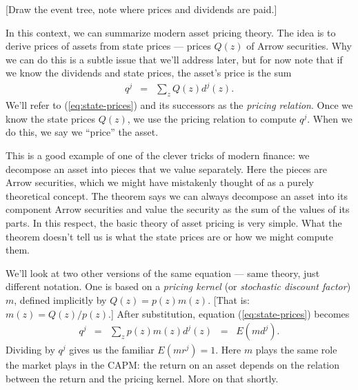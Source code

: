 \documentclass[11pt]{article}
\begin{document}
[Draw the event tree, note where prices and dividends are paid.]

In this context, we can summarize modern asset pricing theory.
The idea is to derive prices of assets from state prices
--- prices $Q(z)$ of Arrow securities.
Why we can do this is a subtle issue that we'll address later,
but for now note that if we know the dividends and state prices,
the asset's price is the sum
\begin{eqnarray}
    q^j   &=& \sum_z Q(z) d^j(z) .
    \label{eq:state-prices}
\end{eqnarray}
We'll refer to (\ref{eq:state-prices}) and its successors
as the {\it pricing relation\/}.
Once we know the state prices $Q(z)$,
we use the pricing relation to compute $q^j$.
When we do this, we say we ``price'' the asset.


This is a good example of one of the clever tricks of modern finance:
we decompose an asset into pieces that we value separately.
Here the pieces are Arrow securities,
which we might have mistakenly thought of as a purely theoretical concept.
The theorem says we can always decompose an asset into its component Arrow securities
and value the security as the sum of the values of its parts.
In this respect, the basic theory of asset pricing is very simple.
What the theorem doesn't tell us is what the state prices are or how
we might compute them.

We'll look at two other versions of the same equation ---
same theory, just different notation.
One is based on a {\it pricing kernel\/}
(or {\it stochastic discount factor\/}) $m$,
defined implicitly  by $ Q(z) = p(z) m(z) $.
[That is:  $m(z) = Q(z)/p(z)$.]
After substitution,
equation (\ref{eq:state-prices}) becomes
\begin{eqnarray}
    q^j   &=& \sum_z p(z) m(z) d^j(z)  \;\;=\;\; E (m d^j) .
    \label{eq:pricing-kernel}
\end{eqnarray}
Dividing by $q^j$ gives us the familiar $E(mr^j) = 1$.
Here $m$ plays the same role the market plays in the CAPM:
the return on an asset depends on the relation between the return and the pricing kernel.
More on that shortly.
\end{document}
